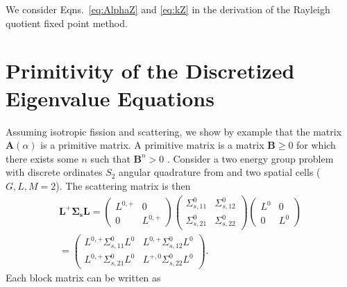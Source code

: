 We consider Eqns.~\ref{eq:AlphaZ} and \ref{eq:kZ} in the derivation of the Rayleigh quotient fixed point method.


%

\section{Primitivity of the Discretized Eigenvalue Equations}

Assuming isotropic fission and scattering, we show by example that the matrix $\mathbf{A}(\alpha)$ is a primitive matrix. A primitive matrix is a matrix $\mathbf{B} \geq 0$ for which there exists some $n$ such that $\mathbf{B}^{n} > 0$ \cite{horn_matrix_2012}.  Consider a two energy group problem with discrete ordinates $S_{2}$ angular quadrature from \cite{lewis_computational_1984} and two spatial cells ($G, L, M = 2$). The scattering matrix is then
\begin{multline}
	\mathbf{L}^{+}  \mathbf{\Sigma_{s}} \mathbf{L} = \begin{pmatrix}
											L^{0,+} & 0 \\
											0 & L^{0,+}
										     \end{pmatrix}
										     \begin{pmatrix}
											\Sigma_{s,11}^{0} & \Sigma_{s,12}^{0} \\
											\Sigma_{s,21}^{0} & \Sigma_{s,22}^{0}
										     \end{pmatrix}
										     \begin{pmatrix}
											L^{0} & 0 \\
											0 & L^{0}
										     \end{pmatrix} \\= 
											\begin{pmatrix}
											L^{0,+}\Sigma_{s,11}^{0}L^{0} & L^{0,+}\Sigma_{s,12}^{0}L^{0} \\
											L^{0,+}\Sigma_{s,21}^{0}L^{0} & L^{+,0}\Sigma_{s,22}^{0}L^{0}
										     \end{pmatrix}.
\end{multline}
Each block matrix can be written as
